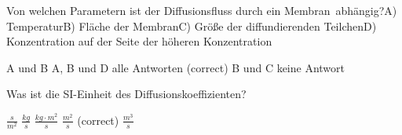 \documentclass[11pt]{exam}
\begin{document}
\begin{questions}
\vspace{3mm}\question Von welchen Parametern ist der Diffusionsfluss durch ein Membran abhängig?A) TemperaturB) Fläche der MembranC) Größe der diffundierenden TeilchenD) Konzentration auf der Seite der höheren Konzentration

\begin{choices}
	\choice A und B
	\choice A, B und D
	\choice alle Antworten (correct)
	\choice B und C
	\choice keine Antwort
\end{choices}

\vspace{3mm}\question Was ist die SI-Einheit des Diffusionskoeffizienten?

\begin{choices}
	\choice \( \frac{s}{m^2} \)
	\choice \( \frac{kg}{s} \)
	\choice \( \frac{kg \cdot m^2}{s} \)
	\choice \( \frac{m^2}{s} \) (correct)
	\choice \( \frac{m^3}{s} \)
\end{choices}

\vspace{3mm}\end{questions}
\end{document}
